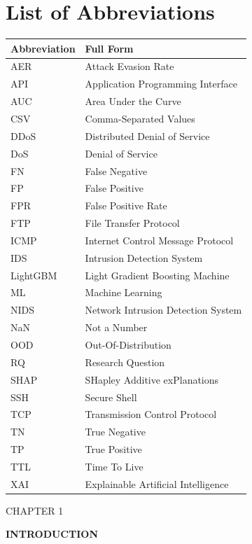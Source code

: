 \documentclass[12pt,a4paper]{report}
\begin{document}
\chapter*{List of Abbreviations}
\begin{tabular}{ll}
\toprule
\textbf{Abbreviation} & \textbf{Full Form} \\
\midrule
AER & Attack Evasion Rate \\
API & Application Programming Interface \\
AUC & Area Under the Curve \\
CSV & Comma-Separated Values \\
DDoS & Distributed Denial of Service \\
DoS & Denial of Service \\
FN & False Negative \\
FP & False Positive \\
FPR & False Positive Rate \\
FTP & File Transfer Protocol \\
ICMP & Internet Control Message Protocol \\
IDS & Intrusion Detection System \\
LightGBM & Light Gradient Boosting Machine \\
ML & Machine Learning \\
NIDS & Network Intrusion Detection System \\
NaN & Not a Number \\
OOD & Out-Of-Distribution \\
RQ & Research Question \\
SHAP & SHapley Additive exPlanations \\
SSH & Secure Shell \\
TCP & Transmission Control Protocol \\
TN & True Negative \\
TP & True Positive \\
TTL & Time To Live \\
XAI & Explainable Artificial Intelligence \\
\bottomrule
\end{tabular}

\clearpage
{}

\begin{center}CHAPTER 1\end{center}
\begin{center}\textbf{INTRODUCTION}\end{center}\vspace{4pt}
\end{document}
